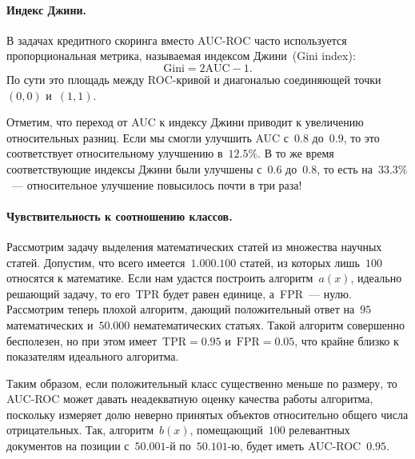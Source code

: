 \documentclass[12pt,fleqn]{article}
\begin{document}
\paragraph{Индекс Джини.}
В задачах кредитного скоринга вместо AUC-ROC часто используется пропорциональная
метрика, называемая индексом Джини~(Gini index):
\[
    \text{Gini}
    =
    2 \text{AUC} - 1.
\]
По сути это площадь между ROC-кривой и диагональю соединяющей точки~$(0, 0)$ и~$(1, 1)$.

Отметим, что переход от AUC к индексу Джини приводит к увеличению относительных разниц.
Если мы смогли улучшить AUC с~$0.8$ до~$0.9$, то это соответствует
относительному улучшению в~$12.5\%$.
В то же время соответствующие индексы Джини были улучшены с~$0.6$ до~$0.8$,
то есть на~$33.3\%$~--- относительное улучшение повысилось почти в три раза!

\paragraph{Чувствительность к соотношению классов.}
Рассмотрим задачу выделения математических статей из множества научных статей.
Допустим, что всего имеется~$1.000.100$ статей, из которых лишь~$100$ относятся к математике.
Если нам удастся построить алгоритм~$a(x)$, идеально решающий задачу,
то его~TPR будет равен единице, а~FPR~--- нулю.
Рассмотрим теперь плохой алгоритм, дающий положительный ответ на~$95$ математических
и~$50.000$ нематематических статьях.
Такой алгоритм совершенно бесполезен, но при этом имеет~$\text{TPR} = 0.95$
и~$\text{FPR} = 0.05$, что крайне близко к показателям идеального алгоритма.

Таким образом, если положительный класс существенно меньше по размеру,
то AUC-ROC может давать неадекватную оценку качества работы алгоритма,
поскольку измеряет долю неверно принятых объектов относительно
общего числа отрицательных.
Так, алгоритм~$b(x)$, помещающий~$100$ релевантных документов
на позиции с~$50.001$-й по~$50.101$-ю, будет иметь AUC-ROC~$0.95$.
\end{document}
